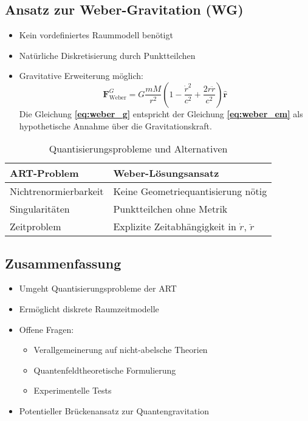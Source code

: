 \subsection{Ansatz zur Weber-Gravitation (WG)}
\begin{itemize}[leftmargin=*,noitemsep]
    \item Kein vordefiniertes Raummodell benötigt
    \item Natürliche Diskretisierung durch Punktteilchen
    \item Gravitative Erweiterung möglich:
    \begin{equation}\label{eq:weber_g}
    \bm{F}_{\text{Weber}}^{G} = G\frac{mM}{r^2}\left(1 - \frac{\dot{r}^2}{c^2} + \frac{2r\ddot{r}}{c^2}\right)\bm{\hat{r}}
    \end{equation}
    Die Gleichung \textbf{\ref{eq:weber_g}} entspricht der Gleichung \textbf{\ref{eq:weber_em}} als hypothetische Annahme über die Gravitationskraft.
\end{itemize}

\begin{table}[h]
\centering
\caption{Quantisierungsprobleme und Alternativen}
\begin{tabularx}{\linewidth}{lX}
\toprule
\textbf{ART-Problem} & \textbf{Weber-Lösungsansatz} \\
\midrule
Nichtrenormierbarkeit & Keine Geometriequantisierung nötig \\
Singularitäten & Punktteilchen ohne Metrik \\
Zeitproblem & Explizite Zeitabhängigkeit in $\dot{r}$, $\ddot{r}$ \\
\bottomrule
\end{tabularx}
\end{table}

\subsection*{Zusammenfassung}
\begin{itemize}[leftmargin=*,noitemsep]
    \item Umgeht Quantisierungsprobleme der ART
    \item Ermöglicht diskrete Raumzeitmodelle
    \item Offene Fragen:
    \begin{itemize}[noitemsep]
        \item Verallgemeinerung auf nicht-abelsche Theorien
        \item Quantenfeldtheoretische Formulierung
        \item Experimentelle Tests
    \end{itemize}
    \item Potentieller Brückenansatz zur Quantengravitation
\end{itemize}

